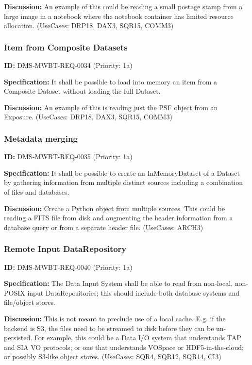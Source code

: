 \documentclass[SE,toc,lsstdraft]{lsstdoc}
\begin{document}
\textbf{Discussion:}
An example of this could be reading a small postage stamp from a large image in a notebook where the notebook container has limited resource allocation. (UseCases: DRP18, DAX3, SQR15, COMM3)

\subsubsection{Item from Composite Datasets}

\label{DMS-MWBT-REQ-0034}
\textbf{ID:} DMS-MWBT-REQ-0034 (Priority: 1a)

\textbf{Specification:}
It shall be possible to load into memory an item from a Composite Dataset without loading the full Dataset.

\textbf{Discussion:}
An example of this is reading just the PSF object from an Exposure. (UseCases: DRP18, DAX3, SQR15, COMM3)

\subsubsection{Metadata merging}

\label{DMS-MWBT-REQ-0035}
\textbf{ID:} DMS-MWBT-REQ-0035 (Priority: 1a)

\textbf{Specification:}
It shall be possible to create an InMemoryDataset of a Dataset by gathering information from multiple distinct sources including a combination of files and databases.

\textbf{Discussion:}
Create a Python object from multiple sources. This could be reading a FITS file from disk and augmenting the header information from a database query or from a separate header file. (UseCases: ARCH3)

\subsubsection{Remote Input DataRepository}

\label{DMS-MWBT-REQ-0040}
\textbf{ID:} DMS-MWBT-REQ-0040 (Priority: 1a)

\textbf{Specification:}
The Data Input System shall be able to read from non-local, non-POSIX input DataRepositories; this should include both database systems and file/object stores.

\textbf{Discussion:}
This is not meant to preclude use of a local cache. E.g. if the backend is S3, the files need to be streamed to disk before they can be un-persisted. For example, this could be a Data I/O system that understands TAP and SIA VO protocols; or one that understands VOSpace or HDF5-in-the-cloud; or possibly S3-like object stores. (UseCases: SQR4, SQR12, SQR14, CI3)
\end{document}
